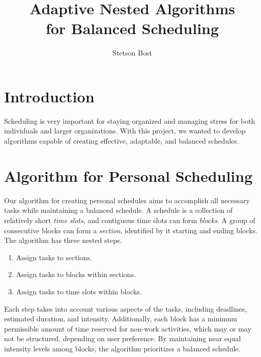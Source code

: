 \documentclass[thesis]{hmcposter}
\author{Stetson Bost}
\title{Adaptive Nested Algorithms\\for Balanced Scheduling}
\begin{document}
\begin{poster}

\section{Introduction}
Scheduling is very important for staying organized and managing stress for both individuals and larger organizations.
With this project, we wanted to develop algorithms capable of creating effective, adaptable, and balanced schedules.

\section{Algorithm for Personal Scheduling}%
Our algorithm for creating personal schedules aims to accomplish all necessary tasks while maintaining a balanced schedule.
A schedule is a collection of relatively short \emph{time slots}, and contiguous time slots can form \emph{blocks}.
A group of consecutive blocks can form a \emph{section}, identified by it starting and ending blocks.
The algorithm has three nested steps.
\begin{enumerate}
	\item
		Assign tasks to sections.
	\item
		Assign tasks to blocks within sections. 
	\item
		Assign tasks to time slots within blocks.
\end{enumerate}
Each step takes into account various aspects of the tasks, including deadlines, estimated duration, and intensity. Additionally, each block has a minimum permissible amount of time reserved for non-work activities, which may or may not be structured, depending on user preference.
By maintaining near equal intensity levels among blocks, the algorithm prioritizes a balanced schedule.


\end{poster}
\end{document}

